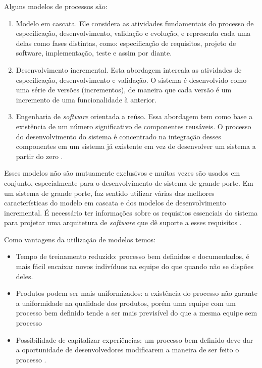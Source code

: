 \documentclass[12pt]{article}
\begin{document}
Alguns modelos de processos são:
\begin{enumerate}
    \item Modelo em cascata. Ele considera as atividades fundamentais do processo de especificação, desenvolvimento, validação e evolução, e representa cada uma delas como fases distintas, como: especificação de requisitos, projeto de software, implementação, teste e assim por diante.
    \item Desenvolvimento incremental. Esta abordagem intercala as atividades de especificação, desenvolvimento e validação. O sistema é desenvolvido como uma série de versões (incrementos), de maneira que cada versão é um incremento de uma funcionalidade à anterior.
    \item Engenharia de \textit{software} orientada a reúso. Essa abordagem tem como base a existência de um número significativo de componentes reusáveis. O processo do desenvolvimento do sistema é concentrado na integração desses componentes em um sistema já existente em vez de desenvolver um sistema a partir do zero  \cite{sommerville2007engenharia}.
\end{enumerate}

Esses modelos não são mutuamente exclusivos e muitas vezes são usados em conjunto, especialmente para o desenvolvimento de sistema de grande porte. Em um sistema de grande porte, faz sentido utilizar várias das melhores características do modelo em cascata e dos modelos de desenvolvimento incremental. É necessário ter informações sobre os requisitos essenciais do sistema para projetar uma arquitetura de \textit{software} que dê suporte a esses requisitos  \cite{sommerville2007engenharia}.

Como vantagens da utilização de modelos temos:
\begin{itemize}
    \item Tempo de treinamento reduzido: processo bem definidos e documentados, é mais fácil encaixar novos indivíduos na equipe do que quando não se dispões deles.
    \item Produtos podem ser mais uniformizados: a existência do processo não garante a uniformidade na qualidade dos produtos, porém uma equipe com um processo bem definido tende a ser mais previsível do que a mesma equipe sem processo
    \item Possibilidade de capitalizar experiências: um processo bem definido deve dar a oportunidade de desenvolvedores modificarem a maneira de ser feito o processo \cite{wazlawick2013engenharia}.
\end{itemize}
\end{document}
